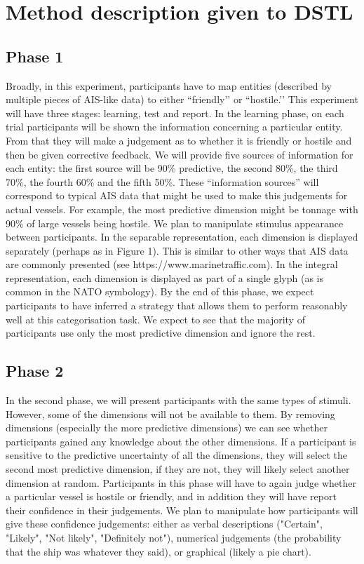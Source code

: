\documentclass[doc, a4paper, apacite]{apa6}
\begin{document}
\section{Method description given to DSTL}

\subsection{Phase 1}
Broadly, in this experiment, participants have to map entities (described by multiple pieces of AIS-like data) to either ``friendly’’ or ``hostile.’’ This experiment will have three stages: learning, test and report. 
In the learning phase, on each trial participants will be shown the information concerning a particular entity. From that they will make a judgement as to whether it is friendly or hostile and then be given corrective feedback. We will provide five sources of information for each entity: the first source will be 90\% predictive, the second 80\%, the third 70\%, the fourth 60\% and the fifth 50\%. 
These “information sources” will correspond to typical AIS data that might be used to make this judgements for actual vessels. For example, the most predictive dimension might be tonnage with 90\% of large vessels being hostile. 
We plan to manipulate stimulus appearance between participants. In the separable representation, each dimension is displayed separately (perhaps as in Figure 1). This is similar to other ways that AIS data are commonly presented (see https://www.marinetraffic.com). In the integral representation, each dimension is displayed as part of a single glyph (as is common in the NATO symbology).
By the end of this phase, we expect participants to have inferred a strategy that allows them to perform reasonably well at this categorisation task. We expect to see that the majority of participants use only the most predictive dimension and ignore the rest. 

\subsection{Phase 2}
In the second phase, we will present participants with the same types of stimuli. However, some of the dimensions will not be available to them. By removing dimensions (especially the more predictive dimensions) we can see whether participants gained any knowledge about the other dimensions. If a participant is sensitive to the predictive uncertainty of all the dimensions, they will select the second most predictive dimension, if they are not, they will likely select another dimension at random. Participants in this phase will have to again judge whether a particular vessel is hostile or friendly, and in addition they will have report their confidence in their judgements. We plan to manipulate how participants will give these confidence judgements: either as verbal descriptions ("Certain", "Likely", "Not likely", "Definitely not"), numerical judgements (the probability that the ship was whatever they said), or graphical (likely a pie chart).
\end{document}
